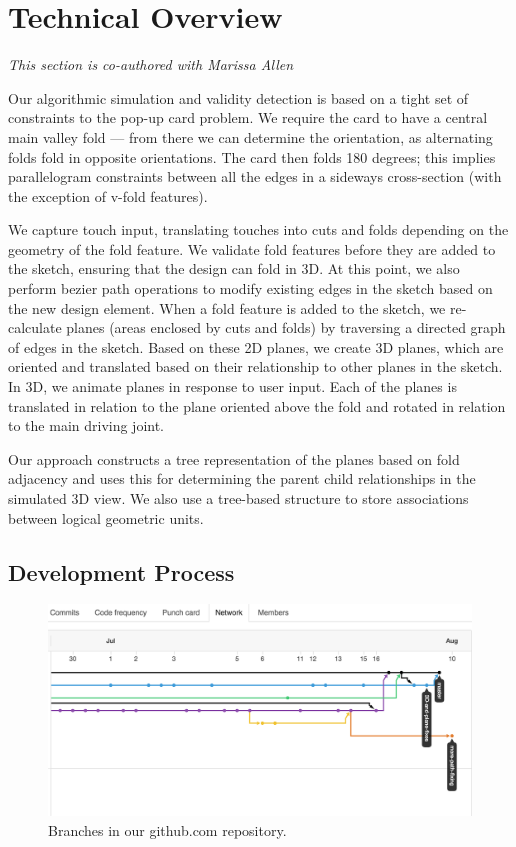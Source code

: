 \section{Technical Overview}\label{technical-overview}

\emph{This section is co-authored with Marissa Allen}

Our algorithmic simulation and validity detection is based on a tight
set of constraints to the pop-up card problem. We require the card to
have a central main valley fold --- from there we can determine the
orientation, as alternating folds fold in opposite orientations. The
card then folds 180 degrees; this implies parallelogram constraints
between all the edges in a sideways cross-section (with the exception of
v-fold features).

We capture touch input, translating touches into cuts and folds
depending on the geometry of the fold feature. We validate fold features
before they are added to the sketch, ensuring that the design can fold
in 3D. At this point, we also perform bezier path operations to modify
existing edges in the sketch based on the new design element. When a
fold feature is added to the sketch, we re-calculate planes (areas
enclosed by cuts and folds) by traversing a directed graph of edges in
the sketch. Based on these 2D planes, we create 3D planes, which are
oriented and translated based on their relationship to other planes in
the sketch. In 3D, we animate planes in response to user input. Each of
the planes is translated in relation to the plane oriented above the
fold and rotated in relation to the main driving joint.

Our approach constructs a tree representation of the planes based on
fold adjacency and uses this for determining the parent child
relationships in the simulated 3D view. We also use a tree-based
structure to store associations between logical geometric units.

\subsection{Development Process}\label{development-process}

\begin{figure}[htbp]
\centering
\includegraphics{figures/shared/02_Overview/gitflow.png}
\caption{Branches in our github.com repository.}
\end{figure}

